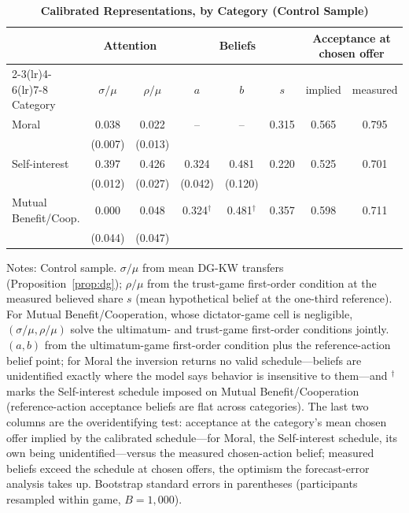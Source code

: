 \begin{table}[!htbp]
\centering
\footnotesize
\renewcommand{\arraystretch}{1.15}
\caption{\textbf{Calibrated Representations, by Category (Control Sample)}}
\label{tab:calibration_p1}
\begin{tabular}{l cc cc c cc}
\toprule
& \multicolumn{2}{c}{Attention} & \multicolumn{3}{c}{Beliefs} & \multicolumn{2}{c}{Acceptance at chosen offer} \\
\cmidrule(lr){2-3}\cmidrule(lr){4-6}\cmidrule(lr){7-8}
Category & $\sigma/\mu$ & $\rho/\mu$ & $a$ & $b$ & $s$ & implied & measured \\
\midrule
Moral & 0.038 & 0.022 & -- & -- & 0.315 & 0.565 & 0.795 \\
 & (0.007) & (0.013) &  &  & & & \\
Self-interest & 0.397 & 0.426 & 0.324 & 0.481 & 0.220 & 0.525 & 0.701 \\
 & (0.012) & (0.027) & (0.042) & (0.120) & & & \\
Mutual Benefit/Coop. & 0.000 & 0.048 & 0.324$^{\dagger}$ & 0.481$^{\dagger}$ & 0.357 & 0.598 & 0.711 \\
 & (0.044) & (0.047) &  &  & & & \\
\bottomrule
\end{tabular}
\begin{flushleft}
\footnotesize Notes: Control sample. $\sigma/\mu$ from mean DG-KW transfers (Proposition~\ref{prop:dg}); $\rho/\mu$ from the trust-game first-order condition at the measured believed share $s$ (mean hypothetical belief at the one-third reference). For Mutual Benefit/Cooperation, whose dictator-game cell is negligible, $(\sigma/\mu,\rho/\mu)$ solve the ultimatum- and trust-game first-order conditions jointly. $(a,b)$ from the ultimatum-game first-order condition plus the reference-action belief point; for Moral the inversion returns no valid schedule---beliefs are unidentified exactly where the model says behavior is insensitive to them---and $^{\dagger}$ marks the Self-interest schedule imposed on Mutual Benefit/Cooperation (reference-action acceptance beliefs are flat across categories). The last two columns are the overidentifying test: acceptance at the category's mean chosen offer implied by the calibrated schedule---for Moral, the Self-interest schedule, its own being unidentified---versus the measured chosen-action belief; measured beliefs exceed the schedule at chosen offers, the optimism the forecast-error analysis takes up. Bootstrap standard errors in parentheses (participants resampled within game, $B=1{,}000$).
\end{flushleft}
\end{table}
